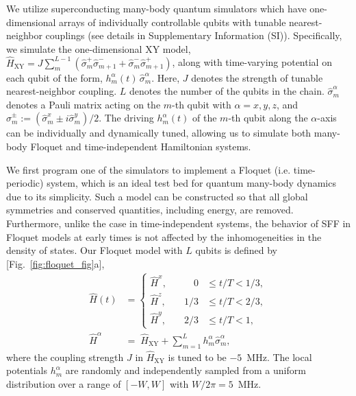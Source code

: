 \documentclass[aps,prx,reprint,twocolumn,superscriptaddress,floatfix,nofootinbib]{revtex4-2}
\newcommand{\hzero}{\hat{H}_{\mathrm{XY}}}
\begin{document}
We utilize superconducting many-body quantum simulators which have one-dimensional arrays of individually controllable qubits with tunable nearest-neighbor couplings (see details in Supplementary Information (SI)). Specifically, we simulate the one-dimensional XY model, $ \hzero = J \sum_{m}^{L-1} \left( \hat{\sigma}_m^{+}  \hat{\sigma}_{m+1}^{-} + \hat{\sigma}_m^{-}  \hat{\sigma}_{m+1}^{+} \right)$, along with time-varying potential on each qubit of the form, $h_{m}^\alpha (t) \, \hat{\sigma}_m^\alpha $. Here, $J$ denotes the strength of tunable nearest-neighbor coupling. $L$ denotes the number of the qubits in the chain.
$\hat{\sigma}_m^{\alpha}$ denotes a Pauli matrix acting on the $m$-th qubit with $\alpha= x,y,z$, and $\hat{\sigma}^{\pm}_m := \left(\hat{\sigma}^{x}_m \pm i \hat{\sigma}^y_m\right)/2$. The driving $h_{m}^\alpha (t)$ of the $m$-th qubit along the $\alpha$-axis  can be individually and dynamically tuned, allowing us to simulate both many-body Floquet and time-independent Hamiltonian systems.

We first program one of the simulators to implement a Floquet (i.e. time-periodic) system, which is an ideal test bed for quantum many-body dynamics due to its simplicity. Such a model can be constructed so that all global symmetries and conserved quantities, including energy, are removed. Furthermore, unlike the case in time-independent systems,
the behavior of SFF in Floquet models at early times is not affected by the inhomogeneities in the density of states. Our Floquet model with $L$ qubits is defined by [Fig.~\ref{fig:floquet_fig}a],
\begin{equation} \label{eq:model_flo}
\begin{aligned}
    \hat{H}(t) &= \left\{
    \begin{array}{llll}
    \hat{H}^{x}, \quad&\quad0  &\leq t/T < 1/3, \\
    \hat{H}^{z}, \quad&1/3&\leq t/T < 2/3, \\
    \hat{H}^{y}, \quad&2/3&\leq t/T < 1,
    \end{array}
    \right.
\\
\hat{H}^{\alpha} &= \;  \hzero +\sum_{m=1}^{L} h_m^{\alpha} \hat{\sigma}_m^{\alpha},
\end{aligned}
\end{equation}
where the coupling strength $J$ in $\hzero$ is tuned to be $-5$~MHz. The local potentials $h_m^{\alpha}$ are randomly and independently sampled from a uniform distribution over a range of $[-W, W]$ with $W/2\pi = 5$~MHz.
\end{document}
